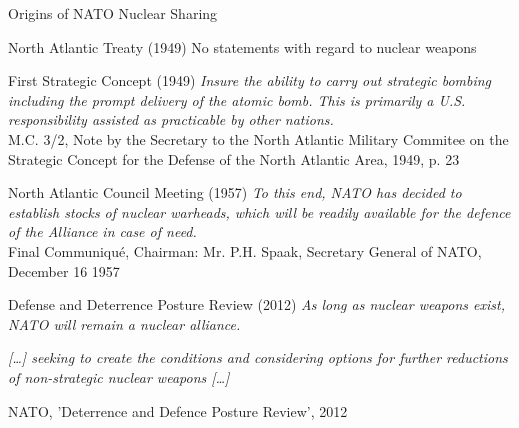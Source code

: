 \documentclass[presentation]{beamer}
\begin{document}
\begin{frame}[label={sec:org0e4bf18}]{Origins of NATO Nuclear Sharing}
\begin{block}{North Atlantic Treaty (1949)}
No statements with regard to nuclear weapons
\end{block}
\begin{block}{First Strategic Concept (1949)}
\emph{Insure the ability to carry out strategic bombing including the prompt delivery of the atomic bomb. This is primarily a U.S. responsibility assisted as practicable by other nations.} \\[0.1em]

\raggedleft \vtiny M.C. 3/2, Note by the Secretary to the North Atlantic Military Commitee on the Strategic Concept for the Defense of the North Atlantic Area, 1949, p. 23

\pause
\end{block}
\begin{block}{North Atlantic Council Meeting (1957)}
\emph{To this end, NATO has decided to establish stocks of nuclear warheads, which will be readily available for the defence of the Alliance in case of need.} \\[0.1em]

\hfill \vtiny Final Communiqué, Chairman: Mr. P.H. Spaak, Secretary General of NATO, December 16 1957
\end{block}
\begin{block}{Defense and Deterrence Posture Review (2012)}
\emph{As long as nuclear weapons exist, NATO will remain a nuclear alliance.}

\emph{[\ldots{}] seeking to create the conditions and considering options for further reductions of non-strategic nuclear weapons [\ldots{}]}

\hfill \vtiny NATO, 'Deterrence and Defence Posture Review', 2012
\end{block}
\end{frame}
\end{document}

